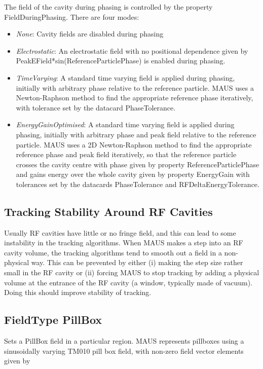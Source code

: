 The field of the cavity during phasing is controlled by the property FieldDuringPhasing. There are four modes:

\liststyleLxiv
\begin{itemize}
\item \textit{None}: Cavity fields are disabled during phasing
\item \textit{Electrostatic}: An electrostatic field with no positional dependence given by\linebreak
PeakEField*sin(ReferenceParticlePhase) is enabled during phasing.
\item \textit{TimeVarying}: A standard time varying field is applied during phasing, initially with arbitrary phase
relative to the reference particle. MAUS uses a Newton-Raphson method to find the appropriate reference phase
iteratively, with tolerance set by the datacard PhaseTolerance.
\item \textit{EnergyGainOptimised}: A standard time varying field is applied during phasing, initially with arbitrary
phase and peak field relative to the reference particle. MAUS uses a 2D Newton-Raphson method to find the appropriate
reference phase and peak field iteratively, so that the reference particle crosses the cavity centre with phase given
by property ReferenceParticlePhase and gains energy over the whole cavity given by property EnergyGain with tolerances
set by the datacards PhaseTolerance and RFDeltaEnergyTolerance.
\end{itemize}
\subsection{Tracking Stability Around RF Cavities}
Usually RF cavities have little or no fringe field, and this can lead to some instability in the tracking algorithms.
When MAUS makes a step into an RF cavity volume, the tracking algorithms tend to smooth out a field in a non-physical
way. This can be prevented by either (i) making the step size rather small in the RF cavity or (ii) forcing MAUS to
stop tracking by adding a physical volume at the entrance of the RF cavity (a window, typically made of vacuum). Doing
this should improve stability of tracking.

\subsection{FieldType PillBox}
Sets a PillBox field in a particular region. MAUS represents pillboxes using a sinusoidally varying TM010 pill box
field, with non-zero field vector elements given by


